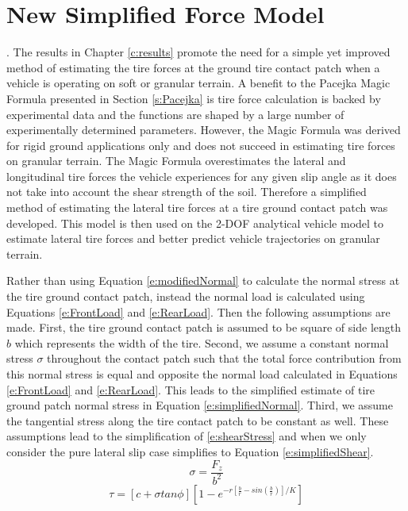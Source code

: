\documentclass[12pt,onecolumn]{report}
\begin{document}
\section{New Simplified Force Model}\label{s:NewForce}. 
The results in Chapter \ref{c:results} promote the need for a simple yet improved method of estimating the tire forces at the ground tire contact patch when a vehicle is operating on soft or granular terrain. A benefit to the Pacejka Magic Formula presented in Section \ref{s:Pacejka} is tire force calculation is backed by experimental data and the functions are shaped by a large number of experimentally determined parameters. However, the Magic Formula was derived for rigid ground applications only and does not succeed in estimating tire forces on granular terrain. The Magic Formula overestimates the lateral and longitudinal tire forces the vehicle experiences for any given slip angle as it does not take into account the shear strength of the soil. Therefore a simplified method of estimating the lateral tire forces at a tire ground contact patch was developed. This model is then used on the 2-DOF analytical vehicle model to estimate lateral tire forces and better predict vehicle trajectories on granular terrain.

Rather than using Equation \ref{e:modifiedNormal} to calculate the normal stress at the tire ground contact patch, instead the normal load is calculated using Equations \ref{e:FrontLoad} and \ref{e:RearLoad}. Then the following assumptions are made. First, the tire ground contact patch is assumed to be square of side length $b$ which represents the width of the tire. Second, we assume a constant normal stress $\sigma$ throughout the contact patch such that the total force contribution from this normal stress is equal and opposite the normal load calculated in Equations \ref{e:FrontLoad} and \ref{e:RearLoad}. This leads to the simplified estimate of tire ground patch normal stress in Equation \ref{e:simplifiedNormal}. Third, we assume the tangential stress along the tire contact patch to be constant as well. These assumptions lead to the simplification of \ref{e:shearStress} and when we only consider the pure lateral slip case simplifies to Equation \ref{e:simplifiedShear}.
%
\begin{equation}\label{e:simplifiedNormal}
\sigma = \frac{F_z}{b^2}
\end{equation}
\begin{equation}\label{e:simplifiedShear}
\tau = [c+\sigma tan\phi][1 - e^{-r[\frac{b}{r} - sin\left(\frac{b}{r}\right)]/K}]
\end{equation}
\end{document}
